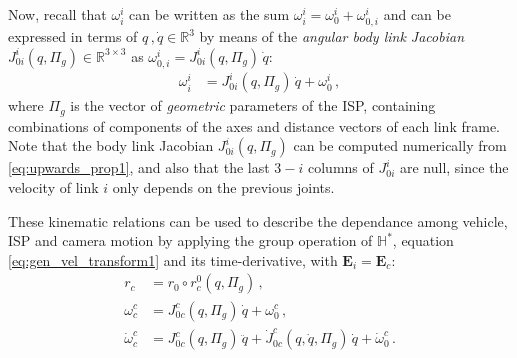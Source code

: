 Now, recall that $\omega^{i}_{i}$ can be written as the sum $\omega^{i}_{i} = \omega^{i}_{0} + \omega^{i}_{0,i}$
%
and can be expressed in terms of $q\,,\dot{q}\in\mathbb{R}^{3}$ by means of the \textit{angular body link Jacobian} $J^i_{0i}(q,\Pi_g) \in \mathbb{R}^{3 \times 3}$ as $\omega^{i}_{0,i} = J^{i}_{0i}(q,\Pi_g) \, \dot{q}$:
%
%
\begin{align}
\omega^{i}_{i} &= J^{i}_{0i}(q,\Pi_g) \, \dot{q} + \omega^{i}_{0} \,,
\label{eq:gen_vel_transform1}
\end{align}
%
where $\Pi_g$ is the vector of {\it geometric} parameters of the ISP, containing combinations of components of the axes and distance vectors of each link frame.
%
Note that the body link Jacobian $J^i_{0i}(q,\Pi_g)$ can be computed numerically from \eqref{eq:upwards_prop1},
%
%
%
%
and also that the last $3-i$ columns of $J^i_{0i}$ are null, since the velocity of link $i$ only depends on the previous joints. 

These kinematic relations can be used to describe the dependance among vehicle, ISP and camera motion by applying the group operation of $\mathbb{H}^*$, equation
\eqref{eq:gen_vel_transform1} and its time-derivative, with $\mathbf{E}_i = \mathbf{E}_c$:
%
\begin{align}
r_{c} &= r_{0} \circ r^0_{c}(q,\Pi_g) \,, \label{eq:camera_orientation1} \\
\omega^{c}_{c} &= J^{c}_{0c}(q,\Pi_g) \, \dot{q} + \omega^{c}_{0} \,, \label{eq:camera_orientation2} \\
\dot{\omega}^{c}_{c} &= J^{c}_{0c}(q,\Pi_g) \, \ddot{q} + \dot{J}^{c}_{0c}(q,\dot{q},\Pi_g) \, \dot{q} + \dot{\omega}^{c}_{0} \,. \label{eq:camera_orientation3}
\end{align}

